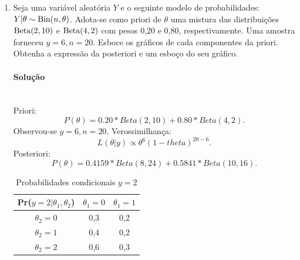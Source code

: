 \documentclass[11pt,a4]{article}\usepackage[]{graphicx}\usepackage[]{xcolor}
\begin{document}
\begin{enumerate}
\begin{solucao}
\begin{itemize}
  \item Posteriori para priori conjugada
    \[
      \tau|y \sim \mathrm{Gama}\left(a + \frac{n}{2},\; b + \frac{1}{2} \sum_{i=1}^n y_i^2\right).
    \]
  \item Priori de Jeffreys
    \[
      \pi_J(\tau) \propto 1/\tau.
    \]
  \item Posteriori para priori de Jeffreys
    \[
      \pi(\tau|y) \propto \tau^{n/2 - 1} \exp\left(-\frac{\tau}{2} \sum y_i^2\right).
    \]
  \end{itemize}
\end{solucao}





\item Seja uma variável aleatória $Y$ e o seguinte modelo de probabilidades: $Y|\theta \sim {\rm Bin}(n, \theta)$.
  Adota-se como priori de $\theta$ uma mistura das distribuições ${\rm Beta}(2, 10)$ e $ {\rm Beta}(4, 2)$ com pesos 0,20 e 0,80, respectivamente.
  Uma amostra forneceu $y = 6, n = 20$. Esboce os gráficos de cada componentes da priori. Obtenha a expressão da posteriori e um esboço do seu gráfico.

\begin{solucao}
\paragraph{\bf Solução} \mbox{} \\
  Priori:
  \[ P(\theta) = 0.20 * Beta(2,10) + 0.80 * Beta(4,2).\]
  Observou-se \(y=6, n=20\). Verossimilhança:
  \[ L(\theta|y) \propto \theta^6 (1-theta)^{20-6}. \]
  Posteriori:
  \[ P(\theta) = 0.4159 * Beta(8,24) + 0.5841 * Beta(10,16).\]

\end{solucao}
  





\begin{table}[ht!]
\centering
\caption{Probabilidades condicionais $y = 2$}
\label{tab:exerc1a-cap4}
  \begin{tabular}{c| c c}
    Pr($y = 2|\theta_1, \theta_2$)         &$\theta_1 = 0$          &$\theta_1 =1$\\
    \hline
    $\theta_2 = 0$                         &0,3                    &0,2\\
    $\theta_2 = 1$                         &0,4                    &0,2\\
    $\theta_2 = 2$                         &0,6                    &0,3\\
    \hline
  \end{tabular}
\end{table}


\end{enumerate}
\end{document}
